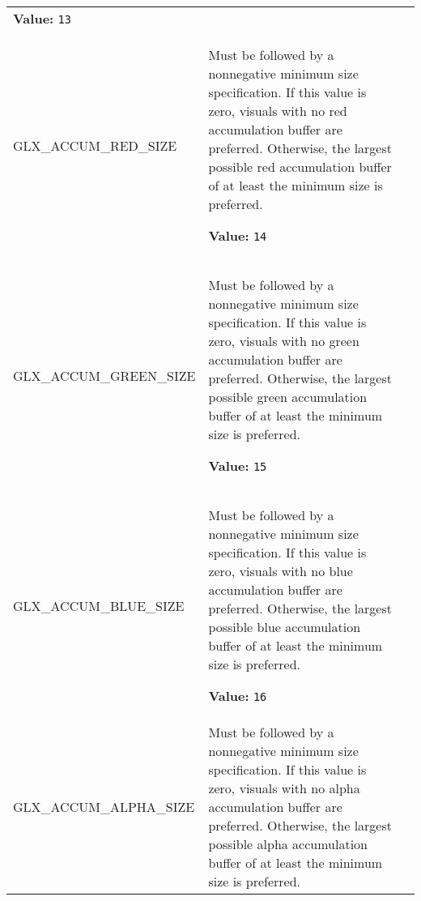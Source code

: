 \begin{longtable}{|p{\varnamewidth}|p{\vardescrwidth}|l}
\textbf{Value:} 
{\tt 13}&\\
\cline{1-2}
\raggedright G\-L\-X\-\_\-A\-C\-C\-U\-M\-\_\-R\-E\-D\-\_\-S\-I\-Z\-E\- & \raggedright Must be followed by a nonnegative minimum size specification. If this value is
zero, visuals with no red accumulation buffer are preferred. Otherwise, the
largest possible red accumulation buffer of at least the minimum size is preferred.

\textbf{Value:} 
{\tt 14}&\\
\cline{1-2}
\raggedright G\-L\-X\-\_\-A\-C\-C\-U\-M\-\_\-G\-R\-E\-E\-N\-\_\-S\-I\-Z\-E\- & \raggedright Must be followed by a nonnegative minimum size specification. If this value is
zero, visuals with no green accumulation buffer are preferred. Otherwise, the
largest possible green accumulation buffer of at least the minimum size is preferred.

\textbf{Value:} 
{\tt 15}&\\
\cline{1-2}
\raggedright G\-L\-X\-\_\-A\-C\-C\-U\-M\-\_\-B\-L\-U\-E\-\_\-S\-I\-Z\-E\- & \raggedright Must be followed by a nonnegative minimum size specification. If this value
is zero, visuals with no blue accumulation buffer are preferred. Otherwise, the
largest possible blue accumulation buffer of at least the minimum size is preferred.

\textbf{Value:} 
{\tt 16}&\\
\cline{1-2}
\raggedright G\-L\-X\-\_\-A\-C\-C\-U\-M\-\_\-A\-L\-P\-H\-A\-\_\-S\-I\-Z\-E\- & \raggedright Must be followed by a nonnegative minimum size specification. If this value
is zero, visuals with no alpha accumulation buffer are preferred. Otherwise,
the largest possible alpha accumulation buffer of at least the minimum size
is preferred.


\end{longtable}
